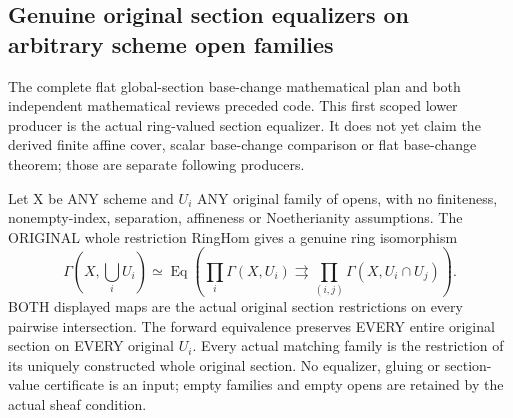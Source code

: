 \subsection{Genuine original section equalizers on arbitrary scheme open families}

The complete flat global-section base-change mathematical plan and both
independent mathematical reviews preceded code. This first scoped lower
producer is the actual ring-valued section equalizer. It does not yet claim
the derived finite affine cover, scalar base-change comparison or flat
base-change theorem; those are separate following producers.

\begin{theorem}
\label{scheme:actual-original-section-equalizer}
\leanok
{}
Let X be ANY scheme and $U_i$ ANY original family of opens, with no finiteness,
nonempty-index, separation, affineness or Noetherianity assumptions.
The ORIGINAL whole restriction RingHom gives a genuine ring isomorphism
\[
 \Gamma(X,\bigcup_i U_i)\simeq
 \operatorname{Eq}\left(
   \prod_i\Gamma(X,U_i)\rightrightarrows
   \prod_{(i,j)}\Gamma(X,U_i\cap U_j)\right).
\]
BOTH displayed maps are the actual original section restrictions on every
pairwise intersection. The forward equivalence preserves EVERY entire
original section on EVERY original $U_i$. Every actual matching family is
the restriction of its uniquely constructed whole original section.
No equalizer, gluing or section-value certificate is an input; empty
families and empty opens are retained by the actual sheaf condition.
\end{theorem}
